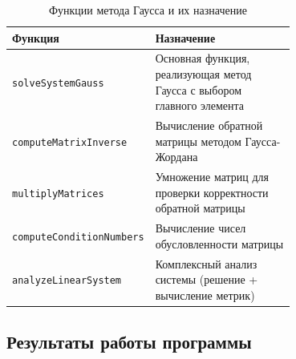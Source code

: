 \documentclass[12pt, a4paper]{article}
\begin{document}
\begin{table}[h]
\centering
\caption{Функции метода Гаусса и их назначение}
\begin{tabular}{|l|p{0.7\linewidth}|}
\hline
\textbf{Функция} & \textbf{Назначение} \\
\hline
\texttt{solveSystemGauss} & Основная функция, реализующая метод Гаусса с выбором главного элемента \\
\texttt{computeMatrixInverse} & Вычисление обратной матрицы методом Гаусса-Жордана \\
\texttt{multiplyMatrices} & Умножение матриц для проверки корректности обратной матрицы \\
\texttt{computeConditionNumbers} & Вычисление чисел обусловленности матрицы \\
\texttt{analyzeLinearSystem} & Комплексный анализ системы (решение + вычисление метрик) \\
\hline
\end{tabular}
\end{table}
\subsection*{Результаты работы программы}
\end{document}
